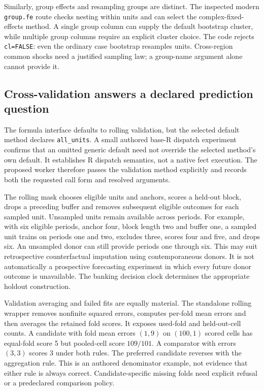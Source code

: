 Similarly, group effects and resampling groups are distinct. The inspected
modern \texttt{group.fe} route checks nesting within units and can select
the complex-fixed-effects method. A single group column can supply the
default bootstrap cluster, while multiple group columns require an
explicit cluster choice. The code rejects \texttt{cl=FALSE}: even the
ordinary case bootstrap resamples units. Cross-region common shocks need
a justified sampling law; a group-name argument alone cannot provide it.
\citep{exec24_fect_source}

\subsection{Cross-validation answers a declared prediction question}
The formula interface defaults to rolling validation, but the selected
default method declares \texttt{all\_units}. A small authored base-R
dispatch experiment confirms that an omitted generic default need not
override the selected method's own default. It establishes R dispatch
semantics, not a native fect execution. The proposed worker therefore
passes the validation method explicitly and records both the requested
call form and resolved arguments.~\citep{exec24_fect_source,exec24_fect_choice}

The rolling mask chooses eligible units and anchors, scores a held-out
block, drops a preceding buffer and removes subsequent eligible outcomes
for each sampled unit. Unsampled units remain available across periods.
For example, with six eligible periods, anchor four, block length two and
buffer one, a sampled unit trains on periods one and two, excludes three,
scores four and five, and drops six. An unsampled donor can still provide
periods one through six. This may suit retrospective counterfactual
imputation using contemporaneous donors. It is not automatically a
prospective forecasting experiment in which every future donor outcome
is unavailable. The banking decision clock determines the appropriate
holdout construction.~\citep{exec24_fect_source,exec24_fect_choice}

Validation averaging and failed fits are equally material. The standalone
rolling wrapper removes nonfinite squared errors, computes per-fold mean
errors and then averages the retained fold scores. It exposes used-fold
and held-out-cell counts. A candidate with fold mean errors $(1,9)$ on
$(100,1)$ scored cells has equal-fold score 5 but pooled-cell score
$109/101$. A comparator with errors $(3,3)$ scores 3 under both rules.
The preferred candidate reverses with the aggregation rule. This is an
authored denominator example, not evidence that either rule is always
correct. Candidate-specific missing folds need explicit refusal or a
predeclared comparison policy.~\citep{exec24_fect_source,exec24_fect_choice}


